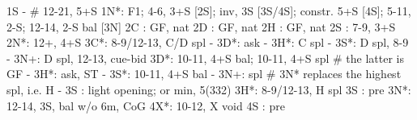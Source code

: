 1S -  # 12-21, 5+S
1N*: F1; 4-6, 3+S [2S]; inv, 3S [3S/4S]; constr. 5+S [4S]; 5-11, 2-S; 12-14, 2-S bal [3N]
2C : GF, nat
2D : GF, nat
2H : GF, nat
2S : 7-9, 3+S
2N*: 12+, 4+S
3C*: 8-9/12-13, C/D spl
   - 3D*: ask
        - 3H*: C spl
        - 3S*: D spl, 8-9
        - 3N+: D spl, 12-13, cue-bid
3D*: 10-11, 4+S bal; 10-11, 4+S spl  # the latter is GF
   - 3H*: ask, ST
        - 3S*: 10-11, 4+S bal
        - 3N+: spl  # 3N* replaces the highest spl, i.e. H
   - 3S : light opening; or min, 5(332)
3H*: 8-9/12-13, H spl
3S : pre
3N*: 12-14, 3S, bal w/o 6m, CoG
4X*: 10-12, X void
4S : pre